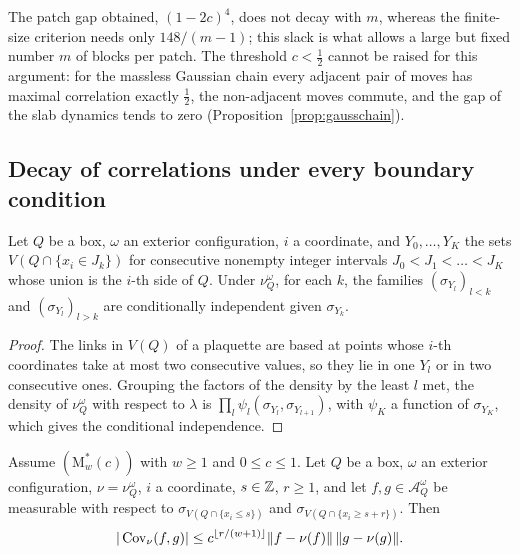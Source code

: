 The patch gap obtained, $(1-2c)^4$, does not decay with $m$, whereas the
finite-size criterion needs only $148/(m-1)$; this slack is what allows a
large but fixed number $m$ of blocks per patch. The threshold $c<\frac12$
cannot be raised for this argument: for the massless Gaussian chain every
adjacent pair of moves has maximal correlation exactly $\frac12$, the
non-adjacent moves commute, and the gap of the slab dynamics tends to zero
(Proposition~\ref{prop:gausschain}).

\subsection{Decay of correlations under every boundary condition}

\begin{lemma}\label{lem:boxmarkov}
Let $Q$ be a box, $\omega$ an exterior configuration, $i$ a coordinate, and
$Y_0,\dots,Y_K$ the sets $V(Q\cap\{x_i\in J_k\})$ for consecutive nonempty
integer intervals $J_0<J_1<\dots<J_K$ whose union is the $i$-th side of $Q$.
Under $\nu^\omega_Q$, for each $k$, the families $(\sigma_{Y_l})_{l<k}$ and
$(\sigma_{Y_l})_{l>k}$ are conditionally independent given $\sigma_{Y_k}$.
\end{lemma}

\begin{proof}
The links in $V(Q)$ of a plaquette are based at points whose $i$-th
coordinates take at most two consecutive values, so they lie in one $Y_l$ or
in two consecutive ones. Grouping the factors of the density by the least
$l$ met, the density of $\nu^\omega_Q$ with respect to $\lambda$ is
$\prod_l\psi_l(\sigma_{Y_l},\sigma_{Y_{l+1}})$, with $\psi_K$ a function of
$\sigma_{Y_K}$, which gives the conditional independence.
\end{proof}

\begin{proposition}\label{prop:alldecay}
Assume $(\mathrm M^*_w(c))$ with $w\ge1$ and $0\le c\le1$. Let $Q$ be a box,
$\omega$ an exterior configuration, $\nu=\nu^\omega_Q$, $i$ a coordinate,
$s\in\mathbb{Z}$, $r\ge1$, and let $f,g\in\mathcal A^\omega_Q$ be measurable with
respect to $\sigma_{V(Q\cap\{x_i\le s\})}$ and $\sigma_{V(Q\cap\{x_i\ge
s+r\})}$. Then
\[
|\operatorname{Cov}_\nu(f,g)|\le c^{\lfloor r/(w+1)\rfloor}\|f-\nu(f)\|\,\|g-\nu(g)\|.
\]
\end{proposition}

